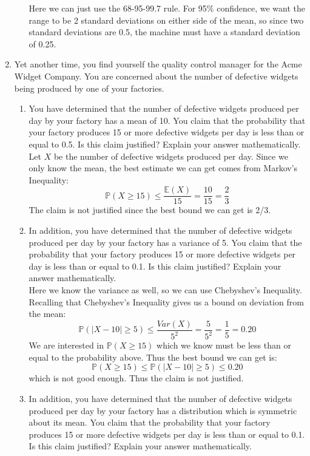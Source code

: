 \documentclass[12pt]{article}
\def\P{{\mathbb P}}
\def\E{{\mathbb E}}
\begin{document}
\begin{enumerate}
\begin{enumerate}
Here we can just use the 68-95-99.7 rule. For 95\% confidence, we want the range to be 2 standard deviations on either side of the mean, so since two standard deviations are 0.5, the machine must have a standard deviation of 0.25.
\end{enumerate}

\item Yet another time, you find yourself the quality control manager for the Acme Widget Company. You are concerned about the number of defective widgets being produced by one of your factories.
\begin{enumerate}
\item You have determined that the number of defective widgets produced per day by your factory has a mean of 10. You claim that the probability that your factory produces 15 or more defective widgets per day is less than or equal to 0.5. Is this claim justified? Explain your answer mathematically.\\

Let $X$ be the number of defective widgets produced per day. Since we only know the mean, the best estimate we can get comes from Markov's Inequality:
\[
\P(X \geq 15) \leq \frac{\E(X)}{15} = \frac{10}{15} = \frac{2}{3}
\]
The claim is not justified since the best bound we can get is 2/3.

\item In addition, you have determined that the number of defective widgets produced per day by your factory has a variance of 5. You claim that the probability that your factory produces 15 or more defective widgets per day is less than or equal to 0.1. Is this claim justified? Explain your answer mathematically.\\

Here we know the variance as well, so we can use Chebyshev's Inequality. Recalling that Chebyshev's Inequality gives us a bound on deviation from the mean:
\[
\P(|X - 10| \geq 5) \leq \frac{Var(X)}{5^2} = \frac{5}{5^2} = \frac{1}{5} = 0.20
\]
We are interested in $\P(X \geq 15)$ which we know must be less than or equal to the probability above. Thus the best bound we can get is:
\[
\P(X \geq 15) \leq \P(|X - 10| \geq 5) \leq 0.20
\]
which is not good enough. Thus the claim is not justified.

\item In addition, you have determined that the number of defective widgets produced per day by your factory has a distribution which is symmetric about its mean. You claim that the probability that your factory produces 15 or more defective widgets per day is less than or equal to 0.1. Is this claim justified? Explain your answer mathematically.\\


\end{enumerate}
\end{enumerate}
\end{document}
